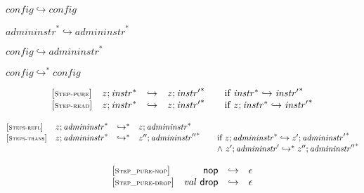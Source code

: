 \documentclass{article}
\begin{document}
$$$$

$\boxed{{\mathit{config}} \hookrightarrow {\mathit{config}}}$

$\boxed{{{\mathit{admininstr}}^\ast} \hookrightarrow {{\mathit{admininstr}}^\ast}}$

$\boxed{{\mathit{config}} \hookrightarrow {{\mathit{admininstr}}^\ast}}$

$\boxed{{\mathit{config}} \hookrightarrow^\ast {\mathit{config}}}$

$$
\begin{array}{@{}l@{}rcl@{}l@{}}
	{[\textsc{\scriptsize Step{-}pure}]} \quad & z ; {{\mathit{instr}}^\ast} &\hookrightarrow& z ; {{\mathit{instr}'}^\ast}
	&\qquad \mbox{if}~{{\mathit{instr}}^\ast} \hookrightarrow {{\mathit{instr}'}^\ast} \\
	{[\textsc{\scriptsize Step{-}read}]} \quad & z ; {{\mathit{instr}}^\ast} &\hookrightarrow& z ; {{\mathit{instr}'}^\ast}
	&\qquad \mbox{if}~z ; {{\mathit{instr}}^\ast} \hookrightarrow {{\mathit{instr}'}^\ast} \\
\end{array}
$$

$$
\begin{array}{@{}l@{}rcl@{}l@{}}
	{[\textsc{\scriptsize Steps{-}refl}]} \quad & z ; {{\mathit{admininstr}}^\ast} &\hookrightarrow^\ast& z ; {{\mathit{admininstr}}^\ast} \\
	{[\textsc{\scriptsize Steps{-}trans}]} \quad & z ; {{\mathit{admininstr}}^\ast} &\hookrightarrow^\ast& {z''} ; {{\mathit{admininstr}''}^\ast}
	&\qquad \mbox{if}~z ; {{\mathit{admininstr}}^\ast} \hookrightarrow {z'} ; {{\mathit{admininstr}'}^\ast} \\
	&&&&\qquad {\land}~{z'} ; {\mathit{admininstr}'} \hookrightarrow^\ast {z''} ; {{\mathit{admininstr}''}^\ast} \\
\end{array}
$$

\vspace{1ex}

$$
\begin{array}{@{}l@{}rcl@{}l@{}}
	{[\textsc{\scriptsize Step\_pure{-}nop}]} \quad & \mathsf{nop} &\hookrightarrow& \epsilon \\
	{[\textsc{\scriptsize Step\_pure{-}drop}]} \quad & {\mathit{val}}~\mathsf{drop} &\hookrightarrow& \epsilon \\
\end{array}
$$

\vspace{1ex}
\end{document}
